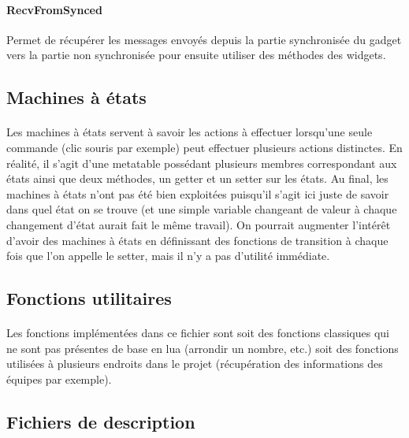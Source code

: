 \documentclass[a4paper]{article}
\begin{document}
\paragraph{RecvFromSynced} Permet de récupérer les messages envoyés depuis la partie synchronisée du gadget vers la partie non synchronisée pour ensuite utiliser des méthodes des widgets.
\subsection{Machines à états\label{statemachine}}
\paragraph{ }
Les machines à états servent à savoir les actions à effectuer lorsqu'une seule commande (clic souris par exemple) peut effectuer plusieurs actions distinctes. En réalité, il s'agit d'une metatable possédant plusieurs membres correspondant aux états ainsi que deux méthodes, un getter et un setter sur les états. Au final, les machines à états n'ont pas été bien exploitées puisqu'il s'agit ici juste de savoir dans quel état on se trouve (et une simple variable changeant de valeur à chaque changement d'état aurait fait le même travail). On pourrait augmenter l'intérêt d'avoir des machines à états en définissant des fonctions de transition à chaque fois que l'on appelle le setter, mais il n'y a pas d'utilité immédiate.
\subsection{Fonctions utilitaires}
\paragraph{ }
Les fonctions implémentées dans ce fichier sont soit des fonctions classiques qui ne sont pas présentes de base en lua (arrondir un nombre, etc.) soit des fonctions utilisées à plusieurs endroits dans le projet (récupération des informations des équipes par exemple).
\subsection{Fichiers de description}
\end{document}
